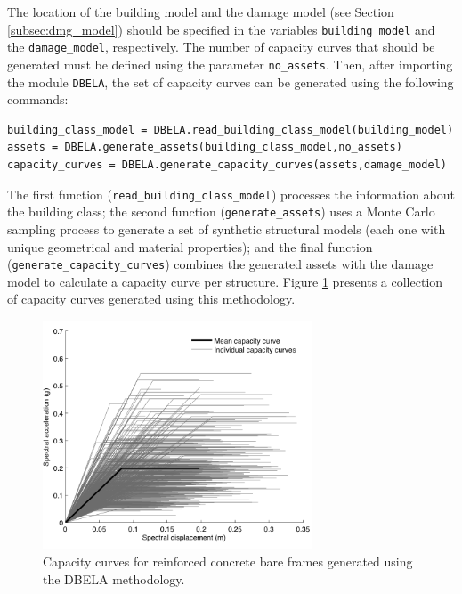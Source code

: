 The location of the building model and the damage model (see Section \ref{subsec:dmg_model}) should be specified in the variables \verb=building_model= and the \verb=damage_model=, respectively. The number of capacity curves that should be generated must be defined using the parameter \verb=no_assets=. Then, after importing the module \verb=DBELA=, the set of capacity curves can be generated using the following commands:

\begin{Verbatim}[frame=single, commandchars=\\\{\}, samepage=true]
building_class_model = DBELA.read_building_class_model(building_model)
assets = DBELA.generate_assets(building_class_model,no_assets)
capacity_curves = DBELA.generate_capacity_curves(assets,damage_model)
\end{Verbatim}

The first function (\verb=read_building_class_model=) processes the information about the building class; the second function (\verb=generate_assets=) uses a Monte Carlo sampling process to generate a set of synthetic structural models (each one with unique geometrical and material properties); and the final function (\verb=generate_capacity_curves=) combines the generated assets with the damage model to calculate a capacity curve per structure. Figure \ref{fig:DBELA_cc} presents a collection of capacity curves generated using this methodology.

\begin{figure}[htb]
  \centering
      \includegraphics[width=8cm]{Figures/synthethic_capacity_curves.png}
  \caption{Capacity curves for reinforced concrete bare frames generated using the DBELA methodology.}
  \label{fig:DBELA_cc}
\end{figure}